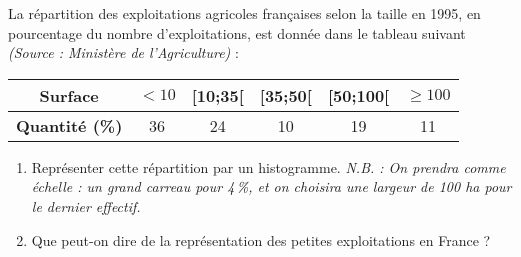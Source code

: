 
\begin{exercice}\label{exoSeconde-0038}

La répartition des exploitations agricoles françaises selon la taille en 1995, en pourcentage du nombre d'exploitations, est donnée dans le tableau suivant \emph{(Source : Ministère de l'Agriculture)} :

\begin{center}
  \begin{tabular}{|c||c|c|c|c|c|}
      \hline
      {\bf Surface}
    & $<10$ & [10;35[ & [35;50[ & [50;100[ & $\geq 100$ \\
        \hline
        \textbf{Quantité (\%)}   & 36 & 24 & 10 & 19 & 11 \\
    \hline
  \end{tabular}
\end{center}

\begin{enumerate}
\item Représenter cette répartition par un histogramme. \emph{N.B. : On prendra comme échelle : un grand carreau pour 4\,\%, et on choisira une largeur de 100 ha pour le dernier effectif.}
\item Que peut-on dire de la représentation des petites exploitations en France ?
\end{enumerate}

\end{exercice}



